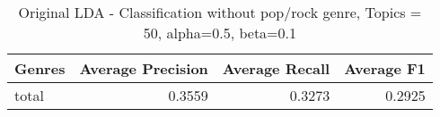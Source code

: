 \begin{table}[h]
\begin{tabular}{|l|r|r|r|}

\hline
\textbf{Genres} &  \textbf{Average Precision} & \textbf{Average Recall} & \textbf{Average F1} \\
\hline
total& 0.3559	& 0.3273	& 0.2925\\
\hline
\end{tabular}
\caption{Original LDA - Classification without pop/rock genre, Topics = 50, alpha=0.5, beta=0.1}
\end{table}